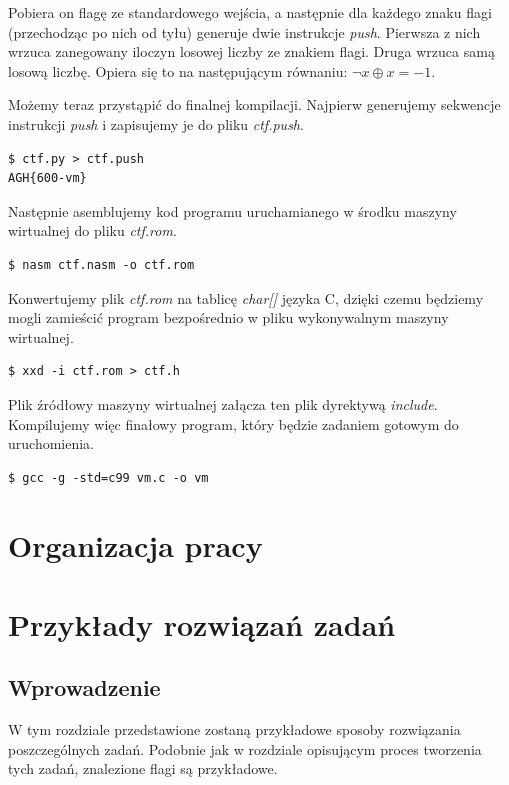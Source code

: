 \documentclass[language=polish,type=eng]{aghmodern}
\begin{document}
Pobiera on flagę ze standardowego wejścia, a następnie dla każdego znaku flagi
(przechodząc po nich od tyłu) generuje dwie instrukcje \emph{push}.
Pierwsza z nich wrzuca zanegowany iloczyn losowej liczby ze znakiem flagi.
Druga wrzuca samą losową liczbę. Opiera się to na następującym równaniu:
\( \neg x \oplus x = -1 \).

Możemy teraz przystąpić do finalnej kompilacji. Najpierw generujemy sekwencje
instrukcji \emph{push} i zapisujemy je do pliku \emph{ctf.push}.

\begin{verbatim}
$ ctf.py > ctf.push
AGH{600-vm}
\end{verbatim}

Następnie asemblujemy kod programu uruchamianego w środku maszyny wirtualnej
do pliku \emph{ctf.rom}.

\begin{verbatim}
$ nasm ctf.nasm -o ctf.rom
\end{verbatim}

Konwertujemy plik \emph{ctf.rom} na tablicę \emph{char[]} języka C, dzięki czemu
będziemy mogli zamieścić program bezpośrednio w pliku wykonywalnym maszyny
wirtualnej.

\begin{verbatim}
$ xxd -i ctf.rom > ctf.h
\end{verbatim}

Plik źródłowy maszyny wirtualnej załącza ten plik dyrektywą \emph{include}.
Kompilujemy więc finałowy program, który będzie zadaniem gotowym do uruchomienia.

\begin{verbatim}
$ gcc -g -std=c99 vm.c -o vm
\end{verbatim}

\chapter{Organizacja pracy}

\chapter{Przykłady rozwiązań zadań}
\label{chap:writeups}

\section{Wprowadzenie}

W tym rozdziale przedstawione zostaną przykładowe sposoby rozwiązania poszczególnych zadań.
Podobnie jak w rozdziale opisującym proces tworzenia tych zadań, znalezione
flagi są przykładowe.
\end{document}
